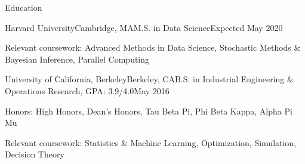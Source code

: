 \documentclass{resume} %
\begin{document}

\begin{rSection}{Education}

\begin{rSubsection}{Harvard University}{Cambridge, MA}{M.S. in Data Science}{Expected May 2020}
\item Relevant coursework: Advanced Methods in Data Science, Stochastic Methods \& Bayesian Inference, Parallel Computing
\end{rSubsection}


\begin{rSubsection}{University of California, Berkeley}{Berkeley, CA}{B.S. in Industrial Engineering \& Operations Research, GPA: 3.9/4.0}{May 2016}
\item Honors: High Honors, Dean's Honors, Tau Beta Pi, Phi Beta Kappa, Alpha Pi Mu
\item Relevant coursework: Statistics \& Machine Learning, Optimization, Simulation, Decision Theory
\end{rSubsection}


\end{rSection}

\end{document}
